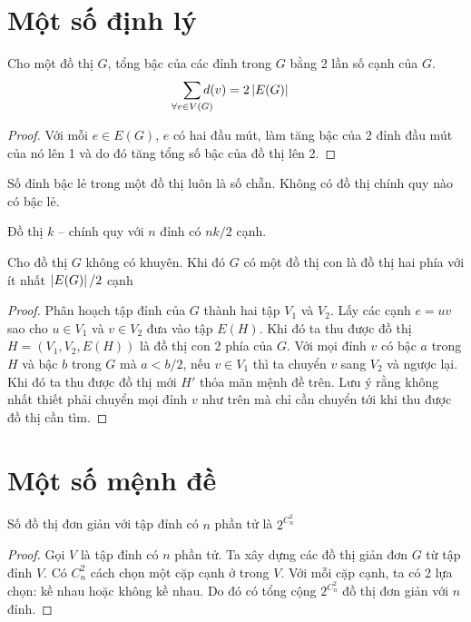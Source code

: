 \section{Một số định lý}
\begin{theorem}
	\label{theo:tong_bac_cua_dinh} Cho một đồ thị $G$, tổng bậc của các đỉnh trong $G$ bằng 2 lần số cạnh của $G$.
	\begin{equation*}
		\sum_{\mathclap{\forall v \in V(G)}}d(v) = 2\abs{E(G)}
	\end{equation*}
	\begin{proof}
		Với mỗi $e \in E(G)$, $e$ có hai đầu mút, làm tăng bậc của $2$ đỉnh đầu mút của nó lên 1 và do đó tăng tổng số bậc của đồ thị lên 2.
	\end{proof}
\end{theorem}
\begin{corollary}
	\label{coro:number_of_odd_degree_vertices_is_even}
Số đỉnh bậc lẻ trong một đồ thị luôn là số chẵn. Không có đồ thị chính quy nào có bậc lẻ.
\end{corollary}
\begin{corollary}
	Đồ thị $k$ -- chính quy với $n$ đỉnh có $nk/2$ cạnh.
\end{corollary}

\begin{theorem}
	\label{theo:sub_bigraph}
	Cho đồ thị $G$ không có khuyên. Khi đó $G$ có một đồ thị con là đồ thị hai phía với ít nhất $\left\lvert E(G)\right\rvert/2$ cạnh
	\begin{proof}
		Phân hoạch tập đỉnh của $G$ thành hai tập $V_1$ và $V_2$. Lấy các cạnh $e=uv$ sao cho $u \in V_1$ và $v\in V_2$ đưa vào tập $E(H)$. Khi đó ta thu được đồ thị $H = (V_1,V_2,E(H))$ là đồ thị con 2 phía của $G$. Với mọi đỉnh $v$ có bậc $a$ trong $H$ và bậc $b$ trong $G$ mà $a < b/2$, nếu $v \in V_1$ thì ta chuyển $v$ sang $V_2$ và ngược lại. Khi đó ta thu được đồ thị mới $H'$ thỏa mãn mệnh đề trên. Lưu ý rằng không nhất thiết phải chuyển mọi đỉnh $v$ như trên mà chỉ cần chuyển tới khi thu được đồ thị cần tìm.
	\end{proof}
\end{theorem}


\section{Một số mệnh đề}
\begin{proposition}
	\label{prop:number_of_n_vertice_graph} Số đồ thị đơn giản với tập đỉnh có $n$ phần tử là $2^{C_n^2}$	
	\begin{proof}
		Gọi $V$ là tập đỉnh có $n$ phần tử. Ta xây dựng các đồ thị giản đơn $G$ từ tập đỉnh $V$. Có $C^2_n$ cách chọn một cặp cạnh ở trong $V$. Với mỗi cặp cạnh, ta có 2 lựa chọn: kề nhau hoặc không kề nhau. Do đó có tổng cộng $2^{C_n^2}$ đồ thị đơn giản với $n$ đỉnh.
	\end{proof}
\end{proposition}

